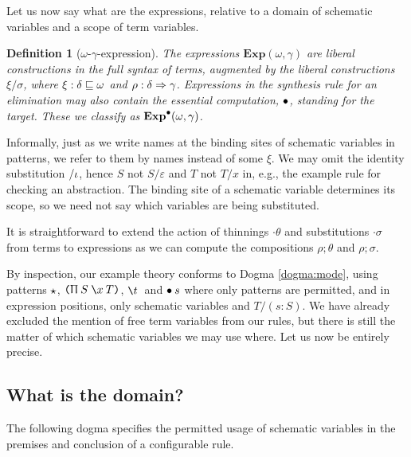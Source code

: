 \documentclass{jfp1}
\newtheorem{definition}[theorem]{Definition}
\newcommand{\emp}{\varepsilon}
\begin{document}
Let us now say what are the expressions, relative to a domain of schematic variables and
a scope of term variables.

\newcommand{\Exp}[2]{\textbf{Exp}(#1,#2)}
\newcommand{\Expo}[2]{\textbf{Exp}^\trg(#1,#2)}
\begin{definition}[$\omega$-$\gamma$-expression]
  The expressions $\Exp\omega\gamma$ are liberal constructions in the full syntax of
  terms, augmented by the liberal constructions $\xi/\sigma$, where
  $\xi : \delta \sqsubseteq \omega$ and $\rho : \delta\Rightarrow\gamma$.
  Expressions in the synthesis rule for an elimination may also contain the
  essential computation, $\bullet$, standing for the target. These we classify
  as $\Expo\omega\gamma$.
\end{definition}

Informally, just as we write names at the binding sites of schematic variables
in patterns, we refer to them by names instead of some $\xi$. We may omit the identity
substitution $/\iota$, hence $S$ not $S/\emp$ and $T$ not $T/x$ in, e.g., the example
rule for checking an abstraction.
The binding site of a schematic variable determines its scope, so we
need not say which variables are being substituted.

It is straightforward to extend the action of thinnings $\cdot\theta$ and substitutions
$\cdot\sigma$ from terms to expressions as we can compute the compositions $\rho;\theta$
and $\rho;\sigma$.

By inspection, our example theory conforms to Dogma \ref{dogma:mode}, using
patterns $\star$, $\PI SxT$, $\la t$ and $\bullet\:s$ where only patterns are permitted,
and in expression positions, only schematic variables and $T/(s:S)$. We have
already excluded the mention of free term variables from our rules, but there
is still the matter of which schematic variables we may use where. Let us now
be entirely precise.


\subsection{What is the domain?}

The following dogma specifies the permitted usage of schematic variables in the
premises and conclusion of a configurable rule.
\end{document}
